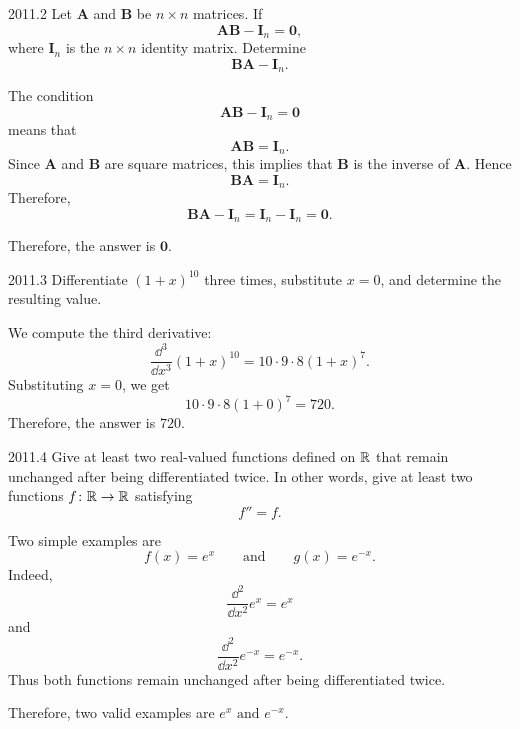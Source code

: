     \begin{pastproblem}{2011.2}
        Let $\mathbf{A}$ and $\mathbf{B}$ be $n\times n$ matrices. If
        \[
            \mathbf{A}\mathbf{B}-\mathbf{I}_n=\mathbf{0},
        \]
        where $\mathbf{I}_n$ is the $n\times n$ identity matrix. Determine
        \[
            \mathbf{B}\mathbf{A}-\mathbf{I}_n.
        \]
    \end{pastproblem}

    \begin{solution}
        The condition
        \[
            \mathbf{A}\mathbf{B}-\mathbf{I}_n=\mathbf{0}
        \]
        means that
        \[
            \mathbf{A}\mathbf{B}=\mathbf{I}_n.
        \]
        Since $\mathbf{A}$ and $\mathbf{B}$ are square matrices, this implies that $\mathbf{B}$ is
        the inverse of $\mathbf{A}$. Hence
        \[
            \mathbf{B}\mathbf{A}=\mathbf{I}_n.
        \]
        Therefore,
        \[
            \mathbf{B}\mathbf{A}-\mathbf{I}_n
            =
            \mathbf{I}_n-\mathbf{I}_n
            =
            \mathbf{0}.
        \]

        Therefore, the answer is $\boxed{\mathbf{0}}$.
    \end{solution}

    \begin{pastproblem}{2011.3}
        Differentiate $(1+x)^{10}$ three times, substitute $x=0$, and determine the resulting value.
    \end{pastproblem}

    \begin{solution}
        We compute the third derivative:
        \[
            \frac{\dd^3}{\dd x^3}(1+x)^{10}
            =
            10\cdot 9\cdot 8(1+x)^7.
        \]
        Substituting $x=0$, we get
        \[
            10\cdot 9\cdot 8(1+0)^7
            =
            720.
        \]
        Therefore, the answer is $\boxed{720}$.
    \end{solution}

    \begin{pastproblem}{2011.4}
        Give at least two real-valued functions defined on $\mathbb{R}$ that remain unchanged after being
        differentiated twice. In other words, give at least two functions $f\colon\mathbb{R}\to\mathbb{R}$ satisfying
        \[
            f''=f.
        \]
    \end{pastproblem}

    \begin{solution}
        Two simple examples are
        \[
            f(x)=e^x
            \qquad\text{and}\qquad
            g(x)=e^{-x}.
        \]
        Indeed,
        \[
            \frac{\dd^2}{\dd x^2}e^x=e^x
        \]
        and
        \[
            \frac{\dd^2}{\dd x^2}e^{-x}=e^{-x}.
        \]
        Thus both functions remain unchanged after being differentiated twice.

        Therefore, two valid examples are $\boxed{e^x\text{ and }e^{-x}}$.
    \end{solution}

